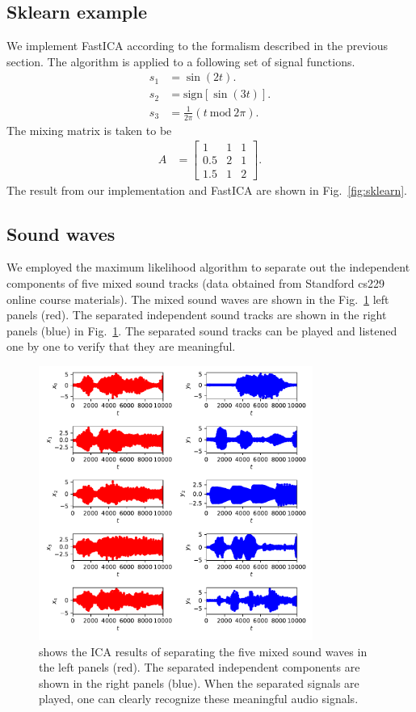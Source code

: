 \documentclass[aps,prl,preprint,superscriptaddress]{revtex4-2}
\begin{document}
\subsection{Sklearn example}
We implement FastICA according to the formalism described in the previous section.
The algorithm is applied to a following set of signal functions.
\begin{align}
s_1 &= \sin(2 t). \\
s_2 &= \mathrm{sign} [\sin(3 t)]. \\
s_3 &= \frac{1}{2\pi} (t~\mathrm{mod}~2\pi).
\end{align}
The mixing matrix is taken to be
\begin{align}
A &= \begin{bmatrix}
1 & 1 & 1 \\
0.5 & 2 & 1 \\
1.5 & 1 & 2
\end{bmatrix}.
\end{align}
The result from our implementation and FastICA are shown in Fig.~\ref{fig:sklearn}.
\subsection{Sound waves}
We employed the maximum likelihood algorithm to separate out the independent components of five mixed sound tracks (data obtained from Standford cs229 online course materials). The mixed sound waves are shown in the  Fig.~\ref{fig:sound} left panels (red). The separated independent sound tracks are shown in the right panels (blue) in Fig.~\ref{fig:sound}. The separated sound tracks can be played and listened one by one to verify that they are meaningful. 
\begin{figure}[b]
\includegraphics[width=0.8\textwidth]{scripts/sound_example.pdf}
 \caption{\label{fig:sound} shows the ICA results of separating the five mixed sound waves in the left panels (red). The separated independent components are shown in the right panels (blue). When the separated signals are played, one can clearly recognize these meaningful audio signals.}
\end{figure}
\end{document}
